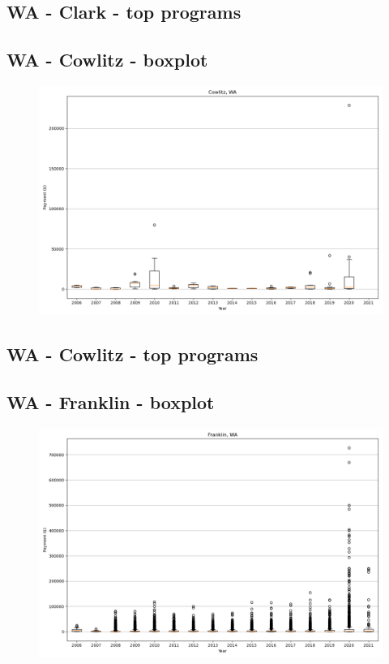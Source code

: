 \subsection*{WA - Clark - top programs}

\newpage
\subsection*{WA - Cowlitz - boxplot}
\begin{figure}[h]
\centering
\includegraphics[width=7in]{../output/boxplots/counties/Cowlitz-WA_boxplot.png}
\end{figure}


\subsection*{WA - Cowlitz - top programs}

\newpage
\subsection*{WA - Franklin - boxplot}
\begin{figure}[h]
\centering
\includegraphics[width=7in]{../output/boxplots/counties/Franklin-WA_boxplot.png}
\end{figure}


